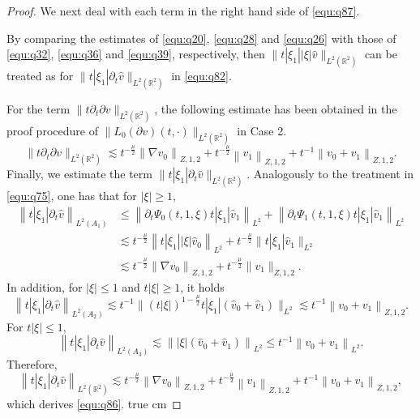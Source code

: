 \documentclass[10pt,a4paper]{amsart}
\newcommand{\R}{\mathbb R}
\newcommand{\f}{\frac}
\newcommand{\p}{\partial}
\begin{document}
\begin{proof}
We next deal with each term in the right hand side of \eqref{equ:q87}.

By comparing the estimates of \eqref{equ:q20}, \eqref{equ:q28} and \eqref{equ:q26} with those of \eqref{equ:q32},
\eqref{equ:q36} and \eqref{equ:q39}, respectively, then $\|t|\xi_1||\xi|\hat{v}\|_{L^2(\R^2)}$ can be treated
as for $\|t|\xi_1|\p_t\hat{v}\|_{L^2(\R^2)}$ in \eqref{equ:q82}.

For the term $\|t\p_t\p v\|_{L^2(\R^2)}$, the following estimate has been obtained in the  proof procedure of
$\|L_0(\p v)(t, \cdot)\|_{L^2(\R^2)}$ in Case 2.
$$
\|t\p_t\p v\|_{L^2(\R^2)}\lesssim t^{-\f{\mu}{2}}\left\|\nabla v_0\right\|_{Z, 1, 2}+t^{-\f{\mu}{2}}\left\|v_1\right\|_{Z, 1,2}+t^{-1}\left\|v_0+v_1\right\|_{Z, 1, 2}.
$$
Finally, we estimate the term $\|t|\xi_1|\p_t\hat{v}\|_{L^2(\R^2)}$. Analogously to the treatment in \eqref{equ:q75},
one has that for $|\xi|\geq 1$,
\begin{equation}\label{equ:q88}
\begin{aligned}
\left\|t|\xi_1|\p_t\hat{v}\right\|_{L^2(A_1)} & \leq\left\|\p_t\Psi_{0 }(t, 1, \xi)t|\xi_1|\hat{v}_{1}\right\|_{L^{2}}+\left\|\p_t\Psi_{1 }(t, 1, \xi)t|\xi_1|\hat{v}_{1}\right\|_{L^{2}} \\
& \lesssim t^{-\frac{\mu}{2}}\left\|t|\xi_1||\xi| \hat{v}_{0}\right\|_{L^2}+t^{-\f{\mu}{2}} \|t|\xi_1|\hat{v}_{1}\|_{L^{2}}\\
& \lesssim t^{-\frac{\mu}{2}}\left\|\nabla v_{0}\right\|_{Z, 1, 2}+t^{-\f{\mu}{2}} \|v_{1}\|_{Z, 1, 2}.
\end{aligned}
\end{equation}
In addition, for $|\xi|\leq1$ and $t|\xi|\geq1$, it holds
\begin{equation}\label{equ:q89}
\left\|t|\xi_1|\p_t\hat{v}\right\|_{L^2(A_2)}
\lesssim t^{-1} \big\|(t|\xi|)^{1-\f{\mu}{2}}t|\xi_1|(\hat{v}_{0}+\hat{v}_{1})\big\|_{L^{2}} \lesssim t^{-1}\left\|v_0+v_1\right\|_{Z, 1, 2}.
\end{equation}
For $t|\xi|\leq1$,
$$
\left\|t|\xi_1|\p_t\hat{v}\right\|_{L^2(A_3)} \lesssim \left\||\xi|(\hat{v}_{0}+\hat{v}_{1})\right\|_{L^{2}}  \leq t^{-1}\left\|v_{0}+v_{1}\right\|_{L^{2}}.
$$
Therefore,
\begin{equation}\label{equ:q90}
\left\|t|\xi_1|\p_t\hat{v}\right\|_{L^2(\R^2)}\lesssim t^{-\f{\mu}{2}}\left\|\nabla v_0\right\|_{Z, 1, 2}
+t^{-\f{\mu}{2}}\left\| v_1\right\|_{Z, 1, 2}+t^{-1}\left\|v_0+v_1\right\|_{Z, 1, 2},
\end{equation}
which derives \eqref{equ:q86}.
 true cm


\end{proof}
\end{document}
